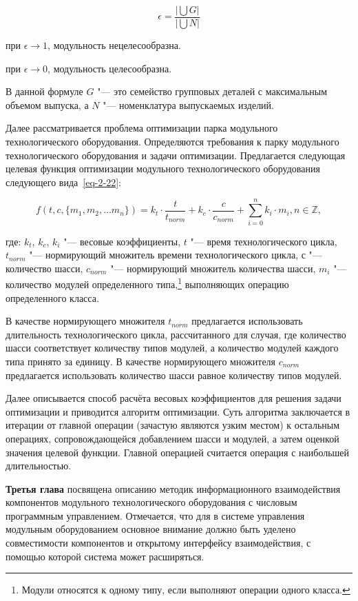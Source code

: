 \[
\epsilon = \frac{\big|\bigcup G \big|}{\big|\bigcup N \big|}
\]

\noindent при $\epsilon \rightarrow 1$, модульность нецелесообразна.

\noindent при $\epsilon \rightarrow 0$, модульность целесообразна.   

В данной формуле $G$ "--- это семейство групповых деталей с максимальным объемом выпуска, а $N$ "--- номенклатура выпускаемых изделий. 

Далее рассматривается проблема оптимизации парка модульного технологического оборудования. Определяются требования к парку модульного технологического оборудования и задачи оптимизации. Предлагается следующая целевая функция оптимизации модульного технологического оборудования следующего вида~\cref{eq-2-22}:

\begin{equation}
f(t, c, \{m_1, m_2, \ldots m_n \}) = k_t \cdot \frac{t}{t_{norm}} + k_c \cdot \frac{c}{c_{norm}} + \sum_{i=0}^{n}k_i \cdot m_i, n \in \mathbb{Z},
\label{eq-2-22}
\end{equation}

\noindent где:
\noindent $k_t$, $k_c$, $k_i$ "--- весовые коэффициенты,
\noindent $t$ "--- время технологического цикла,
\noindent $t_{norm}$ "--- нормирующий множитель времени технологического цикла,
\noindent $с$ "--- количество шасси,
\noindent $c_{norm}$ "--- нормирующий множитель количества шасси,
\noindent $m_i$ "--- количество модулей определенного типа,\footnote{Модули относятся к одному типу, если выполняют операции одного класса.} выполняющих операцию определенного класса.

В качестве нормирующего множителя $t_{norm}$ предлагается использовать длительность технологического цикла, рассчитанного для случая, где количество шасси соответствует количеству типов модулей, а количество модулей каждого типа принято за единицу. В качестве нормирующего множителя $c_{norm}$ предлагается использовать количество шасси равное количеству типов модулей. 

Далее описывается способ расчёта весовых коэффициентов для решения задачи оптимизации и приводится алгоритм оптимизации. Суть алгоритма заключается в итерации от главной операции (зачастую являются узким местом) к остальным операциях, сопровождающейся добавлением шасси и модулей, а затем оценкой значения целевой функции. Главной операцией считается операция с наибольшей длительностью.

\textbf{Третья глава} посвящена описанию методик информационного взаимодействия компонентов модульного технологического оборудования с числовым программным управлением. Отмечается, что для в системе управления модульным оборудованием основное внимание должно быть уделено совместимости компонентов и открытому интерфейсу взаимодействия, с помощью которой система может расширяться. 

